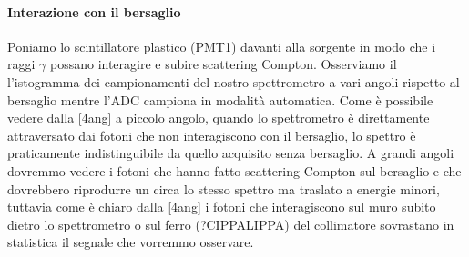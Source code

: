 \paragraph{Interazione con il bersaglio}
Poniamo lo scintillatore plastico (PMT1) davanti alla sorgente in modo che i raggi $\gamma$ possano interagire e subire scattering Compton. Osserviamo il l'istogramma dei campionamenti del nostro spettrometro a vari angoli rispetto al bersaglio mentre l'ADC campiona in modalità automatica. 
Come è possibile vedere dalla \autoref{4ang} a piccolo angolo, quando lo spettrometro è direttamente attraversato dai fotoni che non interagiscono con il bersaglio, lo spettro è praticamente indistinguibile da quello acquisito senza bersaglio. A grandi angoli dovremmo vedere i fotoni che hanno fatto scattering Compton sul bersaglio e che dovrebbero riprodurre un circa lo stesso spettro ma traslato a energie minori, tuttavia come è chiaro dalla  \autoref{4ang} i fotoni che interagiscono sul muro subito dietro lo spettrometro o sul ferro (?CIPPALIPPA) del collimatore sovrastano in statistica il segnale che vorremmo osservare.

